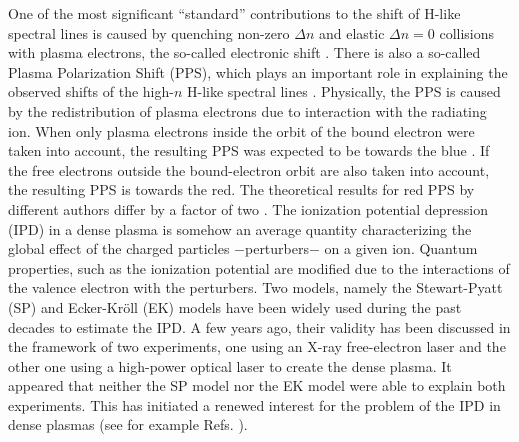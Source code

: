 \documentclass[a4paper,10pt]{article}
\begin{document}
One of the most significant ``standard'' contributions to the shift of H-like spectral lines is caused by quenching non-zero $\Delta n$ \cite{GRIEM83} and elastic $\Delta n=0$ \cite{BOERCKER84} collisions with plasma electrons, the so-called electronic shift \cite{GRIEM88,BENREDJEM90}. There is also a so-called Plasma Polarization Shift (PPS), which plays an important role in explaining the observed shifts of the high-$n$ H-like spectral lines \cite{IGLESIAS95,RENNER98}. Physically, the PPS is caused by the redistribution of plasma electrons due to interaction with the radiating ion. When only plasma electrons inside the orbit of the bound electron were taken into account, the resulting PPS was expected to be towards the blue \cite{BERG62}. If the free electrons outside the bound-electron orbit are also taken into account, the resulting PPS is towards the red. The theoretical results for red PPS by different authors differ by a factor of two \cite{OKS17}. The ionization potential depression (IPD) in a dense plasma is somehow an average quantity characterizing the global effect of the charged particles $-$perturbers$-$ on a given ion. Quantum properties, such as the ionization potential are modified due to the interactions of the valence electron with the perturbers. Two models, namely the Stewart-Pyatt (SP) \cite{STEWART66} and Ecker-Kr\"oll (EK) \cite{ECKER63} models have been widely used during the past decades to estimate the IPD. A few years ago, their validity has been discussed in the framework of two experiments, one using an X-ray free-electron laser \cite{CIRICOSTA12} and the other one using a high-power optical laser \cite{HOARTY13} to create the dense plasma. It appeared that neither the SP model nor the EK model were able to explain both experiments. This has initiated a renewed interest for the problem of the IPD in dense plasmas (see for example Refs. \cite{DEBYE23,ZAGHLOUL09,VINKO14,IGLESIAS14,SON14,CALISTI15b}). 
\end{document}
